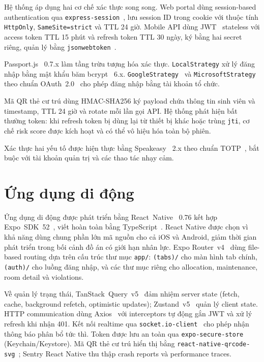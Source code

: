\documentclass[../DoAn.tex]{subfiles}
\begin{document}
Hệ thống áp dụng hai cơ chế xác thực song song. Web portal dùng session-based
authentication qua \texttt{express-session}~\cite{express_session_docs}, lưu
session ID trong cookie với thuộc tính \texttt{HttpOnly}, \texttt{SameSite=strict}
và TTL 24 giờ. Mobile API dùng JWT~\cite{rfc7519} stateless với access token
TTL 15 phút và refresh token TTL 30 ngày, ký bằng hai secret riêng, quản lý
bằng \texttt{jsonwebtoken}~\cite{jsonwebtoken_docs}.

Passport.js~\cite{passportjs_docs} 0.7.x làm tầng trừu tượng hóa xác thực.
\texttt{LocalStrategy} xử lý đăng nhập bằng mật khẩu băm bcrypt~\cite{bcrypt_npm}
6.x. \texttt{GoogleStrategy}~\cite{passport_google_docs} và
\texttt{MicrosoftStrategy}~\cite{passport_microsoft_docs} theo chuẩn
OAuth~2.0~\cite{rfc6749} cho phép đăng nhập bằng tài khoản tổ chức.

Mã QR thẻ cư trú dùng HMAC-SHA256 ký payload chứa thông tin sinh viên và
timestamp, TTL 24 giờ và rotate mỗi lần gọi API. Hệ thống phát hiện bất thường
token: khi refresh token bị dùng lại từ thiết bị khác hoặc trùng \texttt{jti},
cơ chế risk score được kích hoạt và có thể vô hiệu hóa toàn bộ phiên.

Xác thực hai yếu tố được hiện thực bằng Speakeasy~\cite{speakeasy_npm} 2.x
theo chuẩn TOTP~\cite{rfc6238}, bắt buộc với tài khoản quản trị và các thao
tác nhạy cảm.

\section{Ứng dụng di động}
\label{sec:mobile}

Ứng dụng di động được phát triển bằng React~Native~\cite{reactnative2024} 0.76
kết hợp Expo~SDK~52~\cite{expo2024router}, viết hoàn toàn bằng
TypeScript~\cite{typescript_docs}. React Native được chọn vì khả năng dùng
chung phần lớn mã nguồn cho cả iOS và Android, giảm thời gian phát triển trong
bối cảnh đồ án có giới hạn nhân lực. Expo Router~v4~\cite{expo2024router} dùng
file-based routing dựa trên cấu trúc thư mục \texttt{app/}: \texttt{(tabs)/}
cho màn hình tab chính, \texttt{(auth)/} cho luồng đăng nhập, và các thư mục
riêng cho allocation, maintenance, room detail và violations.

Về quản lý trạng thái, TanStack~Query~v5~\cite{tanstack_query_docs} đảm nhiệm
server state (fetch, cache, background refetch, optimistic updates); Zustand~v5~\cite{zustand_docs}
quản lý client state. HTTP communication dùng Axios~\cite{axios_docs} với
interceptors tự động gắn JWT và xử lý refresh khi nhận 401. Kết nối realtime
qua \texttt{socket.io-client}~\cite{socketio2024docs} cho phép nhận thông báo
phân bổ tức thì. Token được lưu an toàn qua
\texttt{expo-secure-store}~\cite{expo_secure_store_docs} (Keychain/Keystore).
Mã QR thẻ cư trú hiển thị bằng
\texttt{react-native-qrcode-svg}~\cite{rn_qrcode_docs}; Sentry React Native
thu thập crash reports và performance traces.
\end{document}
